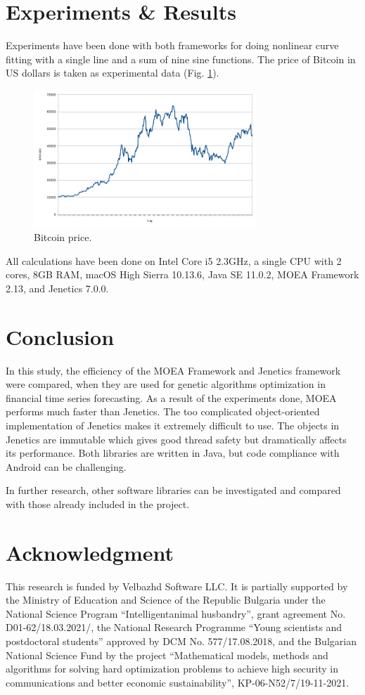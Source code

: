 \documentclass[conference]{IEEEtran}
\begin{document}
\section{Experiments \& Results}

Experiments have been done with both frameworks for doing nonlinear curve fitting with a single line and a sum of nine sine functions. The price of Bitcoin in US dollars is taken as experimental data (Fig. \ref{fig01}).

\begin{figure}[htbp]
\centerline{\includegraphics[width=8.4cm]{fig01.png}}
\caption{Bitcoin price.}
\label{fig01}
\end{figure}

All calculations have been done on Intel Core i5 2.3GHz, a single CPU with 2 cores, 8GB RAM, macOS High Sierra 10.13.6, Java SE
11.0.2, MOEA Framework 2.13, and Jenetics 7.0.0. 

\section{Conclusion}

In this study, the efficiency of the MOEA Framework and Jenetics framework were compared, when they are used for genetic algorithms optimization in financial time series forecasting. As a result of the experiments done, MOEA performs much faster than Jenetics. The too complicated object-oriented implementation of Jenetics makes it extremely difficult to use. The objects in Jenetics are immutable which gives good thread safety but dramatically affects its performance. Both libraries are written in Java, but code compliance with Android can be challenging. 

In further research, other software libraries can be investigated and compared with those already included in the project.

\section*{Acknowledgment}

This research is funded by Velbazhd Software LLC. It is partially supported by the Ministry of Education and Science of the Republic Bulgaria under the National Science Program “Intelligentanimal husbandry”, grant agreement No. D01-62/18.03.2021/, the National Research Programme “Young scientists and postdoctoral students” approved by DCM No. 577/17.08.2018, and the Bulgarian National Science Fund by the project “Mathematical models, methods and algorithms for solving hard optimization problems to achieve high security in communications and better economic sustainability”, KP-06-N52/7/19-11-2021.


\end{document}
